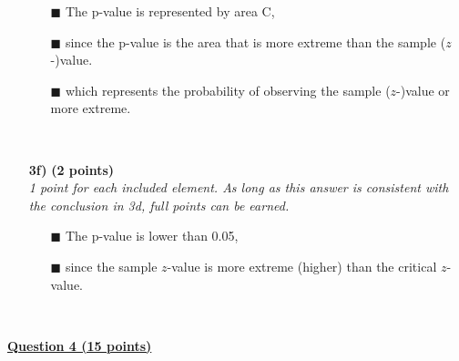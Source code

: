 \begin{itemize}
        \begin{itemize}
        \item[$\blacksquare$] The p-value is represented by area C,
        \item[$\blacksquare$] since the p-value is the area that is more extreme than the sample ($z$-)value.
        \item[$\blacksquare$] which represents the probability of observing the sample ($z$-)value or more extreme.
        \end{itemize} \\
\item[\textbf{3f)}] \textbf{(2 points)} \\
\textit{1 point for each included element. As long as this answer is consistent with the conclusion in 3d, full points can be earned.}
        \begin{itemize}
        \item[$\blacksquare$] The p-value is lower than 0.05,
        \item[$\blacksquare$] since the sample $z$-value is more extreme (higher) than the critical $z$-value.
        \end{itemize} \\
\end{itemize}

\underline{\textbf{Question 4 (15 points)}} \\

